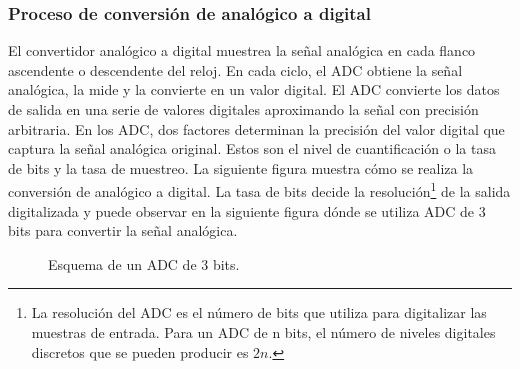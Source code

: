 \begin{enumerate}
\subsubsection*{Proceso de conversión de analógico a digital}
El convertidor analógico a digital muestrea la señal analógica en cada flanco ascendente o descendente del reloj. En cada ciclo, el ADC obtiene la señal analógica, la mide y la convierte en un valor digital. El ADC convierte los datos de salida en una serie de valores digitales aproximando la señal con precisión arbitraria. En los ADC, dos factores determinan la precisión del valor digital que captura la señal analógica original. Estos son el nivel de cuantificación o la tasa de bits y la tasa de muestreo. La siguiente figura muestra cómo se realiza la conversión de analógico a digital. La tasa de bits decide la resolución\footnote{La resolución del ADC es el número de bits que utiliza para digitalizar las muestras de entrada. Para un ADC de n bits, el número de niveles digitales discretos que se pueden producir es $2n$.} de la salida digitalizada y puede observar en la siguiente figura dónde se utiliza ADC de 3 bits para convertir la señal analógica.
\begin{figure}[ht!]
\caption{Esquema de un ADC de 3 bits.}
\end{figure}


\end{enumerate}
